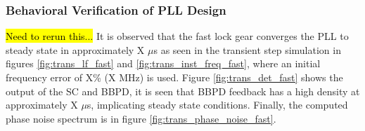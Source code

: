 \FloatBarrier






		\subsubsection{Behavioral Verification of PLL Design}
		\hl{Need to rerun this...}
		It is observed that the fast lock gear converges the PLL to steady state in approximately X $\mu$s as seen in the transient step simulation in figures \ref{fig:trans_lf_fast} and \ref{fig:trans_inst_freq_fast}, where an initial frequency error of X\% (X MHz) is used. Figure \ref{fig:trans_det_fast} shows the output of the SC and BBPD, it is seen that BBPD feedback has a high density at approximately X $\mu$s, implicating steady state conditions. Finally, the computed phase noise spectrum is in figure \ref{fig:trans_phase_noise_fast}.

